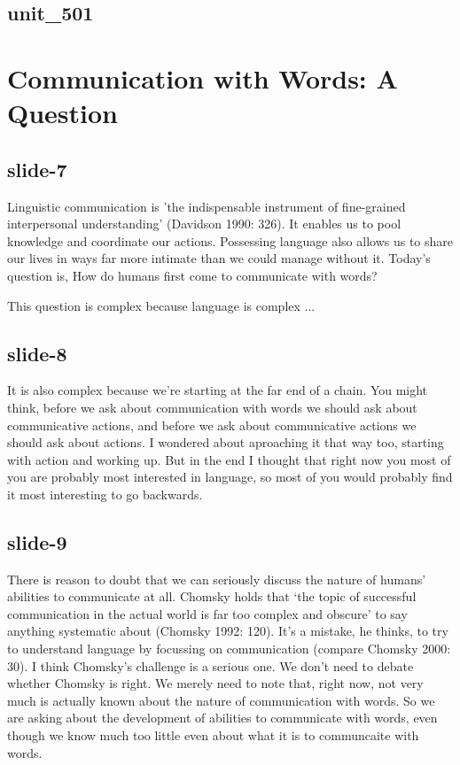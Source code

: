 \documentclass[12pt,\papersize]{extarticle}
\begin{document}
 
\subsection{unit\_501}
 
\section{Communication with Words: A Question}
 
 
\subsection{slide-7}
Linguistic communication is 'the indispensable instrument of fine-grained interpersonal understanding' (Davidson 1990: 326). It enables us to pool knowledge and coordinate our actions. Possessing language also allows us to share our lives in ways far more intimate than we could manage without it.
Today's question is,
How do humans first come to communicate with words?

This question is complex because language is complex ...
 
 
\subsection{slide-8}
It is also complex because we're starting at the far end of a chain. You might think, before we ask about communication with words we should ask about communicative actions, and before we ask about communicative actions we should ask about actions. I wondered about aproaching it that way too, starting with action and working up. But in the end I thought that right now you most of you are probably most interested in language, so most of you would probably find it most interesting to go backwards.
 
 
\subsection{slide-9}
There is reason to doubt that we can seriously discuss the nature of humans' abilities to communicate at all. Chomsky holds that ‘the topic of successful communication in the actual world is far too complex and obscure’ to say anything systematic about (Chomsky 1992: 120). It’s a mistake, he thinks, to try to understand language by focussing on communication (compare Chomsky 2000: 30).
I think Chomsky’s challenge is a serious one. We don't need to debate whether Chomsky is right. We merely need to note that, right now, not very much is actually known about the nature of communication with words.
So we are asking about the development of abilities to communicate with words, even though we know much too little even about what it is to communcaite with words.
 
\end{document}
